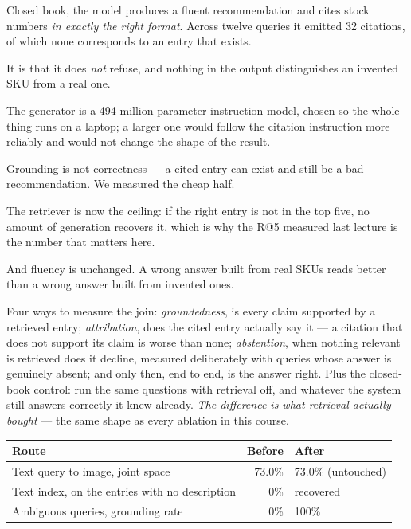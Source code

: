 \documentclass[11pt,a4paper]{article}
\begin{document}
Closed book, the model produces a fluent recommendation and cites stock numbers
\emph{in exactly the right format}. Across twelve queries it emitted 32
citations, of which none corresponds to an entry that exists.

\begin{keybox}[title={The failure is not that it refuses}]
It is that it does \emph{not} refuse, and nothing in the output distinguishes
an invented SKU from a real one.
\end{keybox}

The generator is a 494-million-parameter instruction model, chosen so the whole
thing runs on a laptop; a larger one would follow the citation instruction more
reliably and would not change the shape of the result.

\begin{failbox}[title={Failure condition --- what this does not fix}]
Grounding is not correctness --- a cited entry can exist and still be a bad
recommendation. We measured the cheap half.

The retriever is now the ceiling: if the right entry is not in the top five, no
amount of generation recovers it, which is why the R@5 measured last lecture is
the number that matters here.

And fluency is unchanged. A wrong answer built from real SKUs reads better than
a wrong answer built from invented ones.
\end{failbox}

Four ways to measure the join: \emph{groundedness}, is every claim supported by
a retrieved entry; \emph{attribution}, does the cited entry actually say it ---
a citation that does not support its claim is worse than none;
\emph{abstention}, when nothing relevant is retrieved does it decline, measured
deliberately with queries whose answer is genuinely absent; and only then, end
to end, is the answer right. Plus the closed-book control: run the same
questions with retrieval off, and whatever the system still answers correctly
it knew already. \emph{The difference is what retrieval actually bought} ---
the same shape as every ablation in this course.

\begin{center}
\small
\begin{tabular}{lrl}
\toprule
\textbf{Route} & \textbf{Before} & \textbf{After} \\
\midrule
Text query to image, joint space & 73.0\% & 73.0\% (untouched) \\
Text index, on the entries with no description & 0\% & recovered \\
Ambiguous queries, grounding rate & 0\% & 100\% \\
\bottomrule
\end{tabular}
\end{center}
\end{document}

